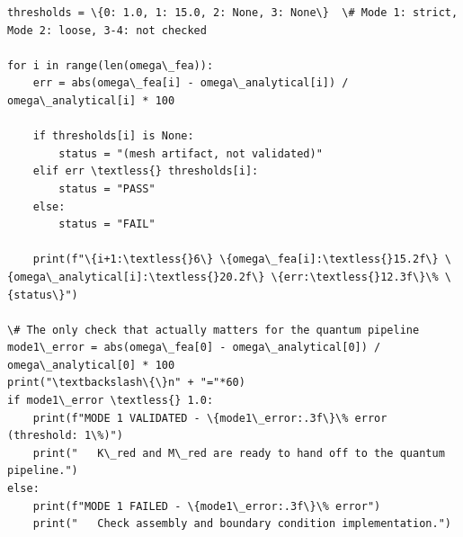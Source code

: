 \documentclass[12pt, a4paper]{article}
\begin{document}
\begin{lstlisting}[style=codestyle, caption={{validate_fea.py --- Beam FEA Validation}}]
thresholds = \{0: 1.0, 1: 15.0, 2: None, 3: None\}  \# Mode 1: strict, Mode 2: loose, 3-4: not checked

for i in range(len(omega\_fea)):
    err = abs(omega\_fea[i] - omega\_analytical[i]) / omega\_analytical[i] * 100
    
    if thresholds[i] is None:
        status = "(mesh artifact, not validated)"
    elif err \textless{} thresholds[i]:
        status = "PASS"
    else:
        status = "FAIL"
    
    print(f"\{i+1:\textless{}6\} \{omega\_fea[i]:\textless{}15.2f\} \{omega\_analytical[i]:\textless{}20.2f\} \{err:\textless{}12.3f\}\% \{status\}")

\# The only check that actually matters for the quantum pipeline
mode1\_error = abs(omega\_fea[0] - omega\_analytical[0]) / omega\_analytical[0] * 100
print("\textbackslash\{\}n" + "="*60)
if mode1\_error \textless{} 1.0:
    print(f"MODE 1 VALIDATED - \{mode1\_error:.3f\}\% error (threshold: 1\%)")
    print("   K\_red and M\_red are ready to hand off to the quantum pipeline.")
else:
    print(f"MODE 1 FAILED - \{mode1\_error:.3f\}\% error")
    print("   Check assembly and boundary condition implementation.")
\end{lstlisting}

\end{document}

